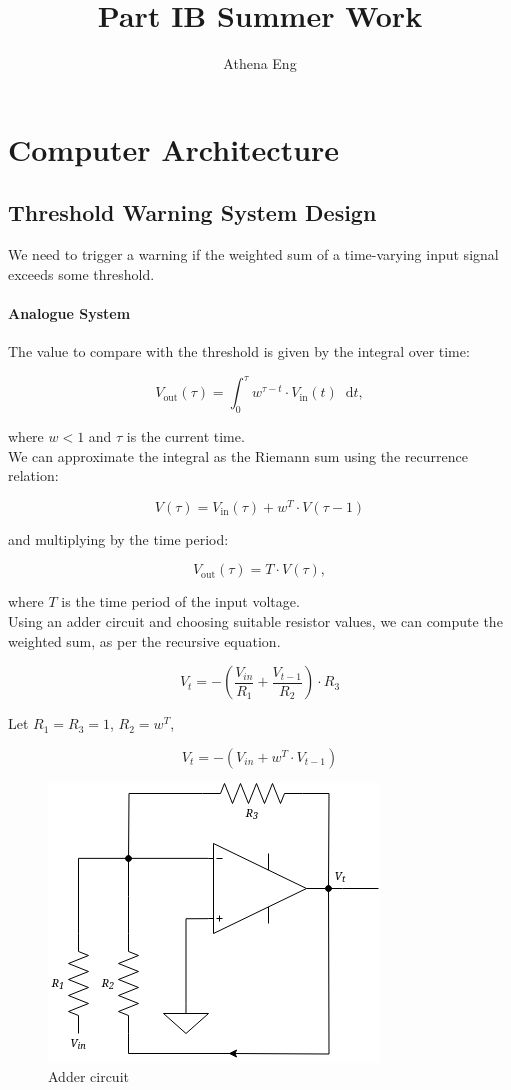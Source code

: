 \documentclass[a4paper, 12pt, oneside]{book}
\title{Part IB Summer Work}
\author{Athena Eng}
\date{}
\newcommand*\diff{\mathop{}\!\mathrm{d}}
\begin{document}
\maketitle
\tableofcontents
\newpage


\chapter{Computer Architecture}

\section{Threshold Warning System Design}
We need to trigger a warning if the weighted sum of a time-varying input signal exceeds some
threshold.

\subsubsection{Analogue System}\label{a}

The value to compare with the threshold is given by the integral over time:

\[V_{\text{out}}(\tau)=\int_{0}^{\tau}w^{\tau-t} \cdot V_{\text{in}}(t) \diff t,\]

where $w < 1$ and $\tau$ is the current time.\\

We can approximate the integral as the Riemann sum using the recurrence relation:

\[V(\tau) = V_{\text{in}}(\tau) + {w^T}\cdot V(\tau-1)\]

and multiplying by the time period:

\[V_{\text{out}}(\tau) = T \cdot V(\tau), \]

where $T$ is the time period of the input voltage.\\

Using an adder circuit and choosing suitable resistor values, we can compute the weighted sum, as per the recursive equation.

\[V_t = -\left(\frac{V_{in}}{R_1} + \frac{V_{t-1}}{R_2}\right)\cdot R_3\]

Let $R_1 = R_3 = 1$, $R_2 = w^T$,

\[V_t = -\left({V_{in}} + w^T\cdot {V_{t-1}}\right)\]

\begin{figure}[H]
  \centering
  \includegraphics[scale=0.5]{adder.png}
  \caption{Adder circuit}
\end{figure}
\end{document}
